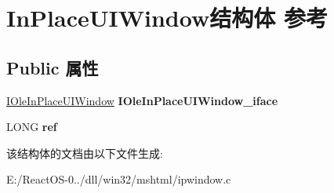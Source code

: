 \hypertarget{struct_in_place_u_i_window}{}\section{In\+Place\+U\+I\+Window结构体 参考}
\label{struct_in_place_u_i_window}
\subsection*{Public 属性}
\begin{DoxyCompactItemize}
\item 
\mbox{\label{struct_in_place_u_i_window_a4ec090396db10f2573fc682cf63239f4}} 
\hyperlink{interface_i_ole_in_place_u_i_window}{I\+Ole\+In\+Place\+U\+I\+Window} {\bfseries I\+Ole\+In\+Place\+U\+I\+Window\+\_\+iface}
\item 
\mbox{\label{struct_in_place_u_i_window_a4e7143f9707cb28ac7532a5bd2be281c}} 
L\+O\+NG {\bfseries ref}
\end{DoxyCompactItemize}


该结构体的文档由以下文件生成\+:\begin{DoxyCompactItemize}
\item 
E\+:/\+React\+O\+S-\/0../dll/win32/mshtml/ipwindow.\+c\end{DoxyCompactItemize}
